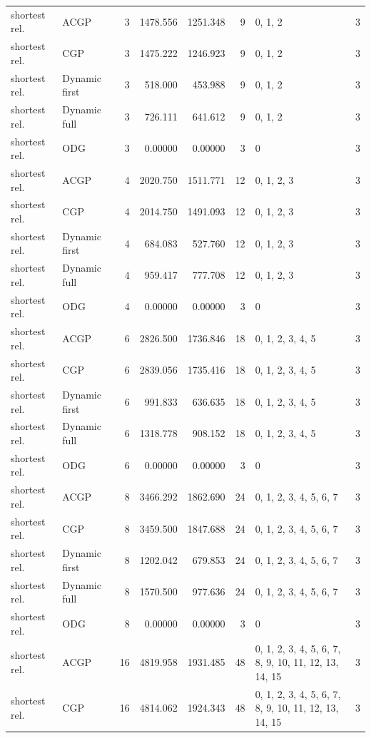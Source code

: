 \documentclass[10pt,a4paper]{article}
\begin{document}
\begin{longtable}{@{}p{23mm}p{29mm}rrrrp{36mm}r@{}}
shortest rel. & ACGP & 3 & 1478.556 & 1251.348 & 9 & 0, 1, 2 & 3 \\
shortest rel. & CGP & 3 & 1475.222 & 1246.923 & 9 & 0, 1, 2 & 3 \\
shortest rel. & Dynamic first & 3 & 518.000 & 453.988 & 9 & 0, 1, 2 & 3 \\
shortest rel. & Dynamic full & 3 & 726.111 & 641.612 & 9 & 0, 1, 2 & 3 \\
shortest rel. & ODG & 3 & 0.00000 & 0.00000 & 3 & 0 & 3 \\
shortest rel. & ACGP & 4 & 2020.750 & 1511.771 & 12 & 0, 1, 2, 3 & 3 \\
shortest rel. & CGP & 4 & 2014.750 & 1491.093 & 12 & 0, 1, 2, 3 & 3 \\
shortest rel. & Dynamic first & 4 & 684.083 & 527.760 & 12 & 0, 1, 2, 3 & 3 \\
shortest rel. & Dynamic full & 4 & 959.417 & 777.708 & 12 & 0, 1, 2, 3 & 3 \\
shortest rel. & ODG & 4 & 0.00000 & 0.00000 & 3 & 0 & 3 \\
shortest rel. & ACGP & 6 & 2826.500 & 1736.846 & 18 & 0, 1, 2, 3, 4, 5 & 3 \\
shortest rel. & CGP & 6 & 2839.056 & 1735.416 & 18 & 0, 1, 2, 3, 4, 5 & 3 \\
shortest rel. & Dynamic first & 6 & 991.833 & 636.635 & 18 & 0, 1, 2, 3, 4, 5 & 3 \\
shortest rel. & Dynamic full & 6 & 1318.778 & 908.152 & 18 & 0, 1, 2, 3, 4, 5 & 3 \\
shortest rel. & ODG & 6 & 0.00000 & 0.00000 & 3 & 0 & 3 \\
shortest rel. & ACGP & 8 & 3466.292 & 1862.690 & 24 & 0, 1, 2, 3, 4, 5, 6, 7 & 3 \\
shortest rel. & CGP & 8 & 3459.500 & 1847.688 & 24 & 0, 1, 2, 3, 4, 5, 6, 7 & 3 \\
shortest rel. & Dynamic first & 8 & 1202.042 & 679.853 & 24 & 0, 1, 2, 3, 4, 5, 6, 7 & 3 \\
shortest rel. & Dynamic full & 8 & 1570.500 & 977.636 & 24 & 0, 1, 2, 3, 4, 5, 6, 7 & 3 \\
shortest rel. & ODG & 8 & 0.00000 & 0.00000 & 3 & 0 & 3 \\
shortest rel. & ACGP & 16 & 4819.958 & 1931.485 & 48 & 0, 1, 2, 3, 4, 5, 6, 7, 8, 9, 10, 11, 12, 13, 14, 15 & 3 \\
shortest rel. & CGP & 16 & 4814.062 & 1924.343 & 48 & 0, 1, 2, 3, 4, 5, 6, 7, 8, 9, 10, 11, 12, 13, 14, 15 & 3 \\

\end{longtable}
\end{document}
